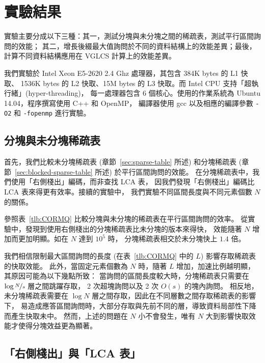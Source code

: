\section{實驗結果} \label{sec:Experiment}

實驗主要分成以下三種：其一，測試分塊與未分塊之間的稀疏表，測試平行區間詢問的效能；
其二，增長後綴最大值詢問於不同的資料結構上的效能差異；最後，
計算不同資料結構應用在 VGLCS 計算上的效能差異。

我們實驗於 Intel Xeon E5-2620 2.4 Ghz 處理器，其包含 384K bytes 的 L1 快取、
1536K bytes 的 L2 快取、15M bytes 的 L3 快取。而 Intel CPU 支持「超執行緒」(hyper-threading)，
每一處理器包含 6 個核心。使用的作業系統為 Ubuntu 14.04，程序撰寫使用 C++ 和 OpenMP，
編譯器使用 gcc 以及相應的編譯參數 {\tt -O2} 和 {\tt -fopenmp} 進行實驗。

\subsection{分塊與未分塊稀疏表}

首先，我們比較未分塊稀疏表 (章節~\ref{sec:sparse-table} 所述) 
和分塊稀疏表 (章節~\ref{sec:blocked-sparse-table} 所述) 於平行區間詢問的效能。
在分塊稀疏表中，我們使用「右側棧出」編碼，而非查找 LCA 表，
因我們發現「右側棧出」編碼比 LCA 表來得更有效率。接續的實驗中，
我們實驗不同區間長度與不同元素個數 $N$ 的關係。

參照表~\ref{tlb:CORMQ} 比較分塊與未分塊的稀疏表在平行區間詢問的效率。
從實驗中，發現到使用右側棧出的分塊稀疏表比未分塊的版本來得快，
效能隨著 $N$ 增加而更加明顯。如在 $N$ 達到 $10^5$ 時，
分塊稀疏表相交於未分塊快上 $1.4$ 倍。

我們相信限制最大區間詢問的長度 (在表~\ref{tlb:CORMQ} 中的 $L$) 影響存取稀疏表的快取效能。
此外，當固定元素個數為 $N$ 時，隨著 $L$ 增加，加速比例越明顯，其原因可能為以下幾點所致：
當詢問的區間長度較大時，分塊稀疏表只需要在 $\log{\nicefrac{N}{s}}$ 層之間跳躍存取，
2 次超塊詢問以及 2 次 $O(s)$ 的塊內詢問。
相反地，未分塊稀疏表需要在 $\log{N}$ 層之間存取，因此在不同層數之間存取稀疏表的影響下，
易造成應答區間詢問時，大部分存取與先前不同的層，導致資料局部性下降而產生快取未中。
然而，上述的問題在 $N$ 小不會發生，唯有 $N$ 大到影響快取效能才使得分塊效益更為顯著。



\subsection{「右側棧出」與「LCA 表」}


